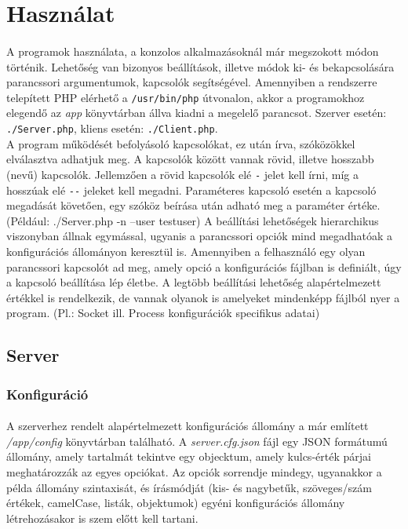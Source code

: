 \documentclass[12pt]{report}
\begin{document}
\section{Használat}
\paragraph{}
A programok használata, a konzolos alkalmazásoknál már megszokott módon történik. Lehetőség van bizonyos beállítások, illetve módok ki- és bekapcsolására parancssori argumentumok, kapcsolók segítségével. Amennyiben a rendszerre telepített PHP elérhető a \verb|/usr/bin/php| útvonalon, akkor a programokhoz elegendő az \textit{app} könyvtárban állva kiadni a megelelő parancsot. Szerver esetén: \verb|./Server.php|, kliens esetén: \verb|./Client.php|. \\
A program működését befolyásoló kapcsolókat, ez után írva, szóközökkel elválasztva adhatjuk meg. A kapcsolók között vannak rövid, illetve hosszabb (nevű) kapcsolók. Jellemzően a rövid kapcsolók elé \verb|-| jelet kell írni, míg a hosszúak elé \verb|--| jeleket kell megadni. Paraméteres kapcsoló esetén a kapcsoló megadását követően, egy szóköz beírása után adható meg a paraméter értéke. (Például: ./Server.php -n --user testuser)
A beállítási lehetőségek hierarchikus viszonyban állnak egymással, ugyanis a parancssori opciók mind megadhatóak a konfigurációs állományon keresztül is. Amennyiben a felhasználó egy olyan parancssori kapcsolót ad meg, amely opció a konfigurációs fájlban is definiált, úgy a kapcsoló beállítása lép életbe.  A legtöbb beállítási lehetőség alapértelmezett értékkel is rendelkezik, de vannak olyanok is amelyeket mindenképp fájlból nyer a program. (Pl.: Socket ill. Process konfigurációk specifikus adatai)
\subsection{Server}
  \subsubsection{Konfiguráció}
    \paragraph{}
  A szerverhez rendelt alapértelmezett konfigurációs állomány a már említett \textit{/app/config} könyvtárban található. A \textit{server.cfg.json} fájl egy JSON formátumú állomány, amely tartalmát tekintve egy objecktum, amely kulcs-érték párjai meghatározzák az egyes opciókat. Az opciók sorrendje mindegy, ugyanakkor a példa állomány szintaxisát, és írásmódját (kis- és nagybetűk, szöveges/szám értékek,  camelCase, listák, objektumok) egyéni konfigurációs állomány létrehozásakor is szem előtt kell tartani.
\end{document}
